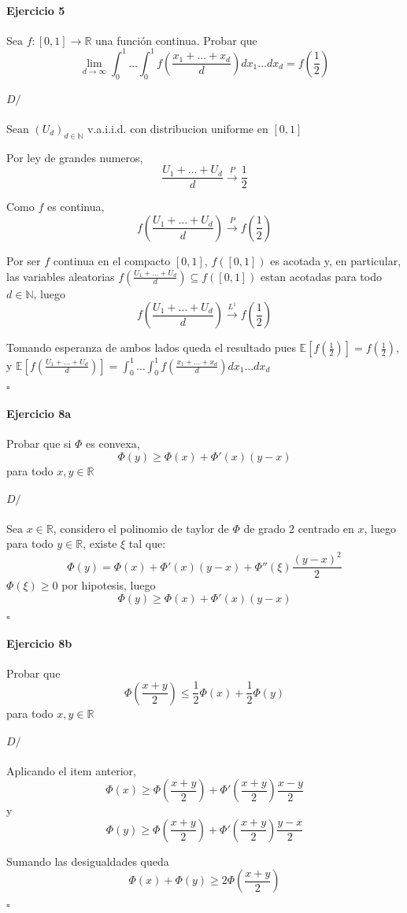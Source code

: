 \documentclass[10pt,a4paper]{article}
\newcommand{\R}{ \mathbb R }
\newcommand{\E}{ \mathbb E }
\newenvironment{ejercicio}[3]
{
	\paragraph{Ejercicio #1}
	#2
	\paragraph{$D/$}
	#3
	\begin{flushright}$\square$\end{flushright}
}{
}
\begin{document}
\begin{ejercicio}{5}{
	Sea $f:[0,1] \to \R$ una funci\'on continua. Probar que
	$$
		\lim_{d\to\infty}
		\int_0^1 \dots \int_0^1
		f\left(
		\frac{
			x_1 + \dots + x_d
		}{d}
		\right)
		dx_1 \dots dx_d
		=
		f\left(\frac{1}{2}\right)
	$$
}{
	Sean $(U_d)_{d \in \mathbb N}$ v.a.i.i.d. con distribucion uniforme en $[0,1]$

	Por ley de grandes numeros,
	$$
		\frac {U_1 + \dots + U_d}{d} \overset{P}{\to} \frac{1}{2}
	$$

	Como $f$ es continua,
	$$
		f\left(\frac {U_1 + \dots + U_d}{d}\right) \overset{P}{\to} f\left(\frac{1}{2}\right)
	$$

	Por ser $f$ continua en el compacto $[0,1]$, $f([0,1])$ es acotada y, en particular, las variables aleatorias $f(\frac {U_1 + \dots + U_d}{d}) \subseteq f([0,1])$ estan acotadas para todo $d \in \mathbb N$, luego
	$$
		f\left(\frac {U_1 + \dots + U_d}{d}\right) \overset{L^1}{\to} f\left(\frac{1}{2}\right)
	$$


	Tomando esperanza de ambos lados queda el resultado pues $\E[f(\frac{1}{2})] = f(\frac{1}{2})$, y
	$\E[f(\frac {U_1 + \dots + U_d}{d})]
	=
	\int_0^1 \dots \int_0^1
	f(
	\frac{
		x_1 + \dots + x_d
	}{d}
	)
	dx_1 \dots dx_d$

}
\end{ejercicio}


\begin{ejercicio}{8a}{
	Probar que si $\Phi$ es convexa,
	$$
		\Phi(y) \ge \Phi(x) + \Phi'(x)(y-x)
	$$
	para todo $ x,y \in \R $
}{
	Sea $x \in \R$, considero el polinomio de taylor de $\Phi$ de grado 2 centrado en $x$, luego para todo $y \in \R$, existe $\xi$ tal que:
	$$
		\Phi(y) = \Phi(x) + \Phi'(x) (y-x) + \Phi''(\xi) \frac{(y-x)^2}{2}
	$$
	$\Phi(\xi) \ge 0$ por hipotesis, luego
	$$
		\Phi(y) \ge \Phi(x) + \Phi'(x) (y-x)
	$$
}
\end{ejercicio}

\begin{ejercicio}{8b}{
	Probar que 
	$$
		\Phi(\frac{x+y}{2}) \le \frac{1}{2}\Phi(x) + \frac{1}{2}\Phi(y)
	$$
	para todo $ x,y \in \R $
}{
	Aplicando el item anterior,
	$$
		\Phi(x) \ge \Phi(\frac{x+y}{2}) + \Phi'(\frac{x+y}{2}) \frac{x-y}{2}
	$$
	y
	$$
		\Phi(y) \ge \Phi(\frac{x+y}{2}) + \Phi'(\frac{x+y}{2}) \frac{y-x}{2}
	$$

	Sumando las desigualdades queda
	$$
		\Phi(x) + \Phi(y) \ge 2 \Phi\left(\frac{x+y}{2}\right)
	$$
}
\end{ejercicio}
\end{document}
